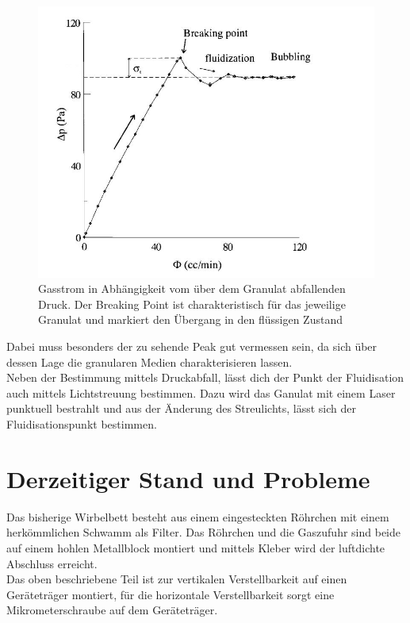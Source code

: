 \begin{figure}[h!]
	\begin{center}
		\includegraphics[scale=0.6]{Castellanos_Diagramm.jpg}
		\caption[Fluidisierungsdiagramm]{Gasstrom in Abhängigkeit vom über dem Granulat abfallenden Druck. Der Breaking Point ist charakteristisch für das jeweilige Granulat und markiert den Übergang in den flüssigen Zustand \cite{Castellanos2000}}
	\end{center}
\end{figure}

Dabei muss besonders der zu sehende Peak gut vermessen sein, da sich über dessen Lage die granularen Medien charakterisieren lassen. \\
Neben der Bestimmung mittels Druckabfall, lässt dich der Punkt der Fluidisation auch mittels Lichtstreuung bestimmen. Dazu wird das Ganulat mit einem Laser punktuell bestrahlt und aus der Änderung des Streulichts, lässt sich der Fluidisationspunkt bestimmen. 


\newpage

\section{Derzeitiger Stand und Probleme}


Das bisherige Wirbelbett besteht aus einem eingesteckten Röhrchen mit einem herkömmlichen Schwamm als Filter. Das Röhrchen und die Gaszufuhr sind beide auf einem hohlen Metallblock montiert und mittels Kleber wird der luftdichte Abschluss erreicht. \\
Das oben beschriebene Teil ist zur vertikalen Verstellbarkeit auf einen Geräteträger montiert, für die horizontale Verstellbarkeit sorgt eine Mikrometerschraube auf dem Geräteträger. 

